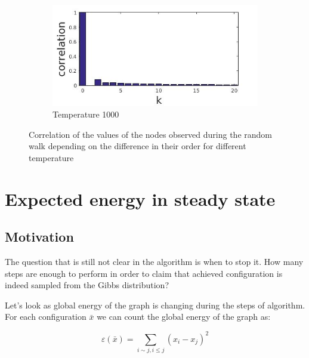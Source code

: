 \documentclass[12pt]{report}
\begin{document}
\begin{figure}[t]
\begin{subfigure}[b]{0.4\textwidth}
    \end{subfigure}   
    ~ 
    \begin{subfigure}[b]{0.4\textwidth}
        \includegraphics[width=\textwidth]{rggT1000corr}
        \caption{Temperature 1000}

    \end{subfigure}
    
    \caption{Correlation of the values of the nodes observed during the random walk depending on the difference in their order for different temperature}
    \label{fig:testGibbsCorr}
\end{figure}

\section{Expected energy in steady state}

\subsection{Motivation}

The question that is still not clear in the algorithm is when to stop it. How many steps are enough to perform in order to claim that achieved configuration is indeed sampled from the Gibbs distribution?

Let's look as global energy of the graph is changing during the steps of algorithm. For each configuration $\bar{x}$ we can count the global energy of the graph as:

$$ \varepsilon (\bar{x}) =  \sum\limits_{i \sim j, i \leq j} (x_i - x_j)^2  $$
\end{document}
